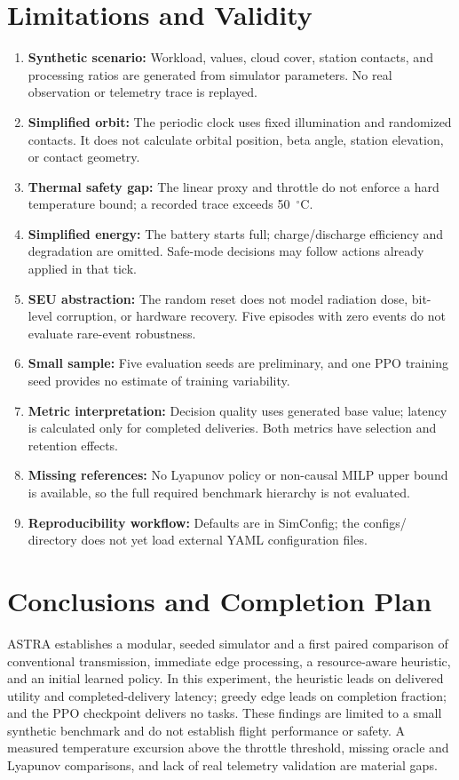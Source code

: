 \documentclass[11pt,letterpaper]{article}
\begin{document}
\section{Limitations and Validity}
\begin{enumerate}
    \item \textbf{Synthetic scenario:} Workload, values, cloud cover, station contacts, and processing ratios are generated from simulator parameters. No real observation or telemetry trace is replayed.
    \item \textbf{Simplified orbit:} The periodic clock uses fixed illumination and randomized contacts. It does not calculate orbital position, beta angle, station elevation, or contact geometry.
    \item \textbf{Thermal safety gap:} The linear proxy and throttle do not enforce a hard temperature bound; a recorded trace exceeds 50~$^\circ$C.
    \item \textbf{Simplified energy:} The battery starts full; charge/discharge efficiency and degradation are omitted. Safe-mode decisions may follow actions already applied in that tick.
    \item \textbf{SEU abstraction:} The random reset does not model radiation dose, bit-level corruption, or hardware recovery. Five episodes with zero events do not evaluate rare-event robustness.
    \item \textbf{Small sample:} Five evaluation seeds are preliminary, and one PPO training seed provides no estimate of training variability.
    \item \textbf{Metric interpretation:} Decision quality uses generated base value; latency is calculated only for completed deliveries. Both metrics have selection and retention effects.
    \item \textbf{Missing references:} No Lyapunov policy or non-causal MILP upper bound is available, so the full required benchmark hierarchy is not evaluated.
    \item \textbf{Reproducibility workflow:} Defaults are in \textrm{SimConfig}; the \textrm{configs/} directory does not yet load external YAML configuration files.
\end{enumerate}

\section{Conclusions and Completion Plan}
ASTRA establishes a modular, seeded simulator and a first paired comparison of conventional transmission, immediate edge processing, a resource-aware heuristic, and an initial learned policy. In this experiment, the heuristic leads on delivered utility and completed-delivery latency; greedy edge leads on completion fraction; and the PPO checkpoint delivers no tasks. These findings are limited to a small synthetic benchmark and do not establish flight performance or safety. A measured temperature excursion above the throttle threshold, missing oracle and Lyapunov comparisons, and lack of real telemetry validation are material gaps.
\end{document}
